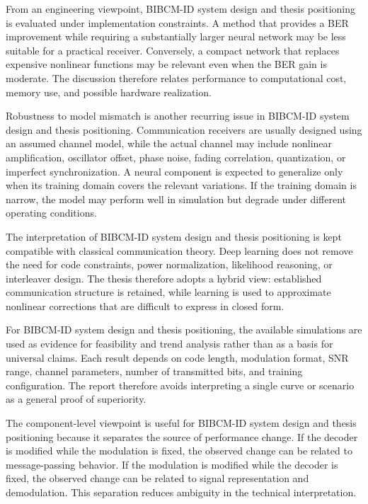 From an engineering viewpoint, BIBCM-ID system design and thesis positioning is evaluated under implementation constraints. A method that provides a BER improvement while requiring a substantially larger neural network may be less suitable for a practical receiver. Conversely, a compact network that replaces expensive nonlinear functions may be relevant even when the BER gain is moderate. The discussion therefore relates performance to computational cost, memory use, and possible hardware realization.

Robustness to model mismatch is another recurring issue in BIBCM-ID system design and thesis positioning. Communication receivers are usually designed using an assumed channel model, while the actual channel may include nonlinear amplification, oscillator offset, phase noise, fading correlation, quantization, or imperfect synchronization. A neural component is expected to generalize only when its training domain covers the relevant variations. If the training domain is narrow, the model may perform well in simulation but degrade under different operating conditions.

The interpretation of BIBCM-ID system design and thesis positioning is kept compatible with classical communication theory. Deep learning does not remove the need for code constraints, power normalization, likelihood reasoning, or interleaver design. The thesis therefore adopts a hybrid view: established communication structure is retained, while learning is used to approximate nonlinear corrections that are difficult to express in closed form.

For BIBCM-ID system design and thesis positioning, the available simulations are used as evidence for feasibility and trend analysis rather than as a basis for universal claims. Each result depends on code length, modulation format, SNR range, channel parameters, number of transmitted bits, and training configuration. The report therefore avoids interpreting a single curve or scenario as a general proof of superiority.

The component-level viewpoint is useful for BIBCM-ID system design and thesis positioning because it separates the source of performance change. If the decoder is modified while the modulation is fixed, the observed change can be related to message-passing behavior. If the modulation is modified while the decoder is fixed, the observed change can be related to signal representation and demodulation. This separation reduces ambiguity in the technical interpretation.

